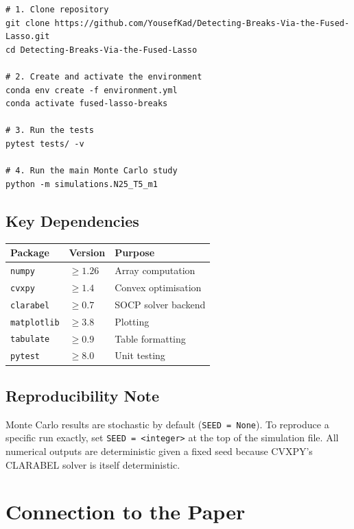 \documentclass[12pt, a4paper]{article}
\theoremstyle{plain}
\theoremstyle{definition}
\theoremstyle{remark}
\begin{document}
\begin{onehalfspacing}
\begin{verbatim}
# 1. Clone repository
git clone https://github.com/YousefKad/Detecting-Breaks-Via-the-Fused-Lasso.git
cd Detecting-Breaks-Via-the-Fused-Lasso

# 2. Create and activate the environment
conda env create -f environment.yml
conda activate fused-lasso-breaks

# 3. Run the tests
pytest tests/ -v

# 4. Run the main Monte Carlo study
python -m simulations.N25_T5_m1
\end{verbatim}

\subsection{Key Dependencies}

\begin{center}
\begin{tabular}{lll}
  \toprule
  Package & Version & Purpose \\
  \midrule
  \texttt{numpy}      & $\ge 1.26$ & Array computation \\
  \texttt{cvxpy}      & $\ge 1.4$  & Convex optimisation \\
  \texttt{clarabel}   & $\ge 0.7$  & SOCP solver backend \\
  \texttt{matplotlib} & $\ge 3.8$  & Plotting \\
  \texttt{tabulate}   & $\ge 0.9$  & Table formatting \\
  \texttt{pytest}     & $\ge 8.0$  & Unit testing \\
  \bottomrule
\end{tabular}
\end{center}

\subsection{Reproducibility Note}

Monte Carlo results are stochastic by default (\texttt{SEED = None}).  To
reproduce a specific run exactly, set \texttt{SEED = <integer>} at the top of
the simulation file.  All numerical outputs are deterministic given a fixed
seed because CVXPY's CLARABEL solver is itself deterministic.

\section{Connection to the Paper}
\label{sec:paper}


\end{onehalfspacing}
\end{document}
